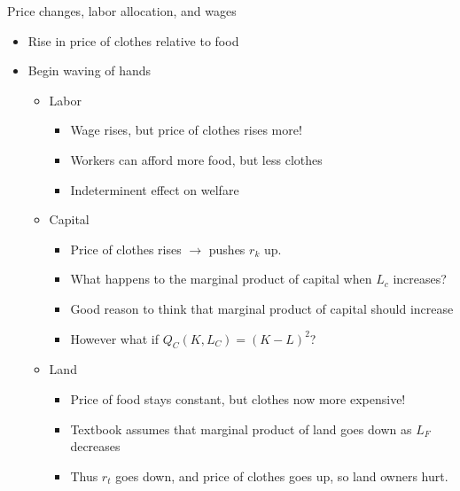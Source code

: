 \documentclass[ignorenonframetext,]{beamer}
\begin{document}
\begin{frame}{Price changes, labor allocation, and wages}

    \begin{itemize}
        \item Rise in price of clothes relative to food 
        \item Begin waving of hands
        \begin{itemize}
            \item Labor
            \begin{itemize}
                    \item Wage rises, but price of clothes rises more!
                    \item Workers can afford more food, but less clothes
                    \item Indeterminent effect on welfare
            \end{itemize}
            \item Capital
            \begin{itemize}
                    \item Price of clothes rises $\rightarrow$ pushes $r_k$ up.
                    \item What happens to the marginal product of capital when $L_c$ increases? 
                    \item Good reason to think that marginal product of capital should increase
                    \item However what if $Q_C(K,L_C) = (K-L)^2$?
            \end{itemize}
            \item Land 
            \begin{itemize}
                    \item Price of food stays constant, but clothes now more expensive! 
                    \item Textbook assumes that marginal product of land goes down as $L_F$ decreases 
                    \item Thus $r_t$ goes down, and price of clothes goes up, so land owners hurt.
            \end{itemize}
        \end{itemize}
    \end{itemize}

\end{frame}
\end{document}
